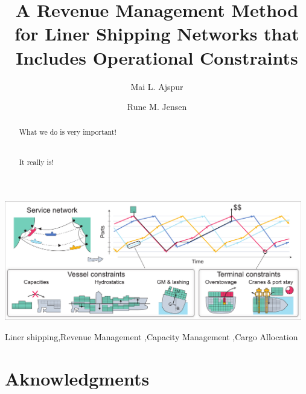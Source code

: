 \documentclass[a4paper,fleqn]{cas-sc}
\begin{document}
\let\WriteBookmarks\relax
\def\floatpagepagefraction{1}
\def\textpagefraction{.001}

\title[mode = title]{A Revenue Management Method for Liner Shipping Networks that Includes Operational Constraints}                      


\author[1]{Mai L. Ajspur}
\address[1]{Rued Langgaards Vej 7, 2300 Copenhagen S, Denmark}

\author[1]{Rune M. Jensen}
\cormark[1]


\begin{abstract}
What we do is very important!\\\\\\It really is!
\end{abstract}


\begin{graphicalabstract}
\includegraphics[width=13cm]{figures/abstract.pdf}
\end{graphicalabstract}

\begin{keywords}
Liner shipping\sep Revenue Management \sep Capacity Management \sep Cargo Allocation%
\end{keywords}

\maketitle









\section*{Aknowledgments}



%

%

\end{document}
